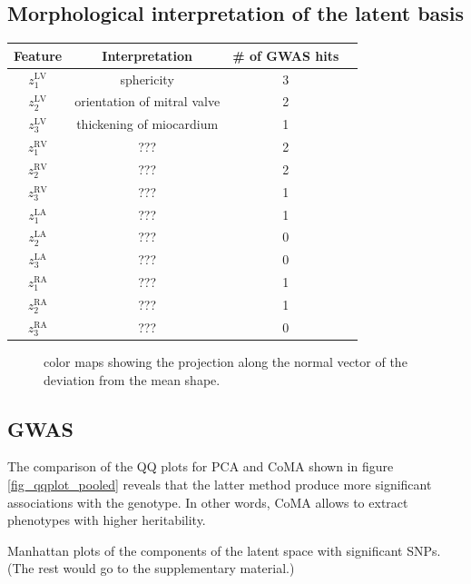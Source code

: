 \documentclass[twocolumn]{llncs}
\begin{document}
\subsection{Morphological interpretation of the latent basis}

\begin{center}
\begin{tabular}{ |c|c|c|c| } 
\hline
Feature & Interpretation & \# of GWAS hits \\
\hline
$z_1^{\text{LV}}$ & sphericity & 3 \\ 
\hline
$z_2^{\text{LV}}$ & orientation of mitral valve & 2\\ 
\hline
$z_3^{\text{LV}}$ & thickening of miocardium & 1 \\ 
\hline
$z_1^{\text{RV}}$ & ??? & 2 \\ 
\hline
$z_2^{\text{RV}}$ & ??? & 2 \\ 
\hline
$z_3^{\text{RV}}$ & ??? & 1 \\ 
\hline
$z_1^{\text{LA}}$ & ???  & 1 \\ 
\hline
$z_2^{\text{LA}}$ & ??? & 0 \\ 
\hline
$z_3^{\text{LA}}$ & ??? & 0 \\ 
\hline
$z_1^{\text{RA}}$ & ??? & 1 \\ 
\hline
$z_2^{\text{RA}}$ & ??? & 1 \\ 
\hline
$z_3^{\text{RA}}$ & ??? & 0 \\ 
\hline
\end{tabular}
\end{center}



\begin{figure}
\caption{color maps showing the projection along the normal vector of the deviation from the mean shape.}
\end{figure}


\subsection{GWAS}

The comparison of the QQ plots for PCA and CoMA shown in figure \ref{fig_qqplot_pooled} reveals that the latter method produce more significant associations with the genotype. In other words, CoMA allows to extract phenotypes with higher heritability.

Manhattan plots of the components of the latent space with significant SNPs. (The rest would go to the supplementary material.)
\end{document}
